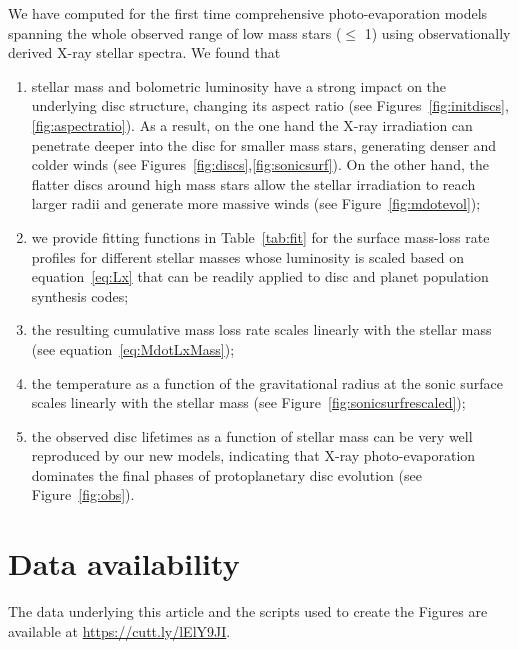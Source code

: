 \documentclass[usenatbib,useAMS,usedcolumn]{mnras}
\begin{document}
  We have computed for the first time comprehensive photo-evaporation models spanning the whole observed range of low mass stars ($\leq$ \SI{1}{\solarmass}) using observationally derived X-ray stellar spectra. 
  We found that

   \begin{enumerate}
      \item stellar mass and bolometric luminosity have a strong impact on the underlying disc structure, changing its aspect ratio (see Figures~\ref{fig:initdiscs},\ref{fig:aspectratio}). 
      As a result, on the one hand the X-ray irradiation can penetrate deeper into the disc for smaller mass stars, generating denser and colder winds (see Figures~\ref{fig:discs},\ref{fig:sonicsurf}). On the other hand, the flatter discs around high mass stars allow the stellar irradiation to reach larger radii and generate more massive winds (see Figure~\ref{fig:mdotevol});
      \item we provide fitting functions in Table~\ref{tab:fit} for the surface mass-loss rate profiles for different stellar masses whose luminosity is scaled based on equation~\ref{eq:Lx} that can be readily applied to disc and planet population synthesis codes;
      \item the resulting cumulative mass loss rate scales linearly with the stellar mass (see equation~\ref{eq:MdotLxMass});
      \item the temperature as a function of the gravitational radius at the sonic surface scales linearly with the stellar mass (see Figure~\ref{fig:sonicsurfrescaled});
      \item the observed disc lifetimes as a function of stellar mass can be very well reproduced by our new models, indicating that X-ray photo-evaporation dominates the final phases of protoplanetary disc evolution (see Figure~\ref{fig:obs}).
   \end{enumerate}

\section{Data availability}
   The data underlying this article and the scripts used to create the Figures are available at \href{https://cutt.ly/lElY9JI}{https://cutt.ly/lElY9JI}.
\end{document}
